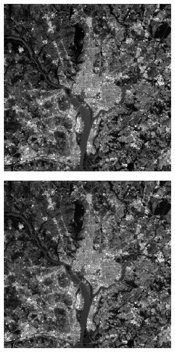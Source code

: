 \begin{figure}[h!]
	\centering
	\begin{subfigure}[b]{0.3\linewidth}
		\includegraphics[width=\linewidth]{myfigure/p10/10_reconstruct_1.png}
		\caption{}
		\label{fig:10reconstruct1}
	\end{subfigure}
	\begin{subfigure}[b]{0.3\linewidth}
		\includegraphics[width=\linewidth]{myfigure/p10/10_reconstruct_2.png}

\end{subfigure}
\end{figure}
